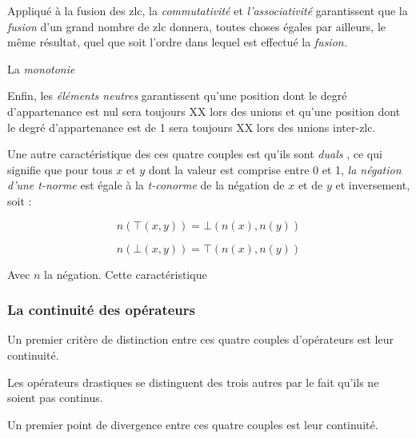 Appliqué à la fusion des \ac{zlc}, la \emph{commutativité} et
\emph{l'associativité} garantissent que la \emph{fusion} d'un grand
nombre de \ac{zlc} donnera, toutes choses égales par ailleurs, le même
résultat, quel que soit l'ordre dans lequel est effectué la
\emph{fusion.}

La \emph{monotonie}

Enfin, les \emph{éléments neutres} garantissent qu'une position dont
le degré d'appartenance est nul sera toujours XX lors des unions et
qu'une position dont le degré d’appartenance est de 1 sera toujours XX
lors des unions inter-\ac{zlc}.


Une autre caractéristique des ces quatre couples est qu'ils sont
\emph{duals} \autocite{Bouchon-Meunier2007}, ce qui signifie que pour
tous \(x\) et \(y\) dont la valeur est comprise entre 0 et 1, \emph{la
  négation d'une \emph{t-norme}} est égale à la \emph{t-conorme} de la
négation de \(x\) et de \(y\) et inversement, soit :

\begin{equation}
  n\left(⊤(x,y)\right) = ⊥\left(n(x), n(y)\right)
\end{equation}

\begin{equation}
  n\left(⊥(x,y)\right) = ⊤\left(n(x), n(y)\right)
\end{equation}

Avec \(n\) la négation. Cette caractéristique




\subsubsection{La continuité des opérateurs}

Un premier critère de distinction entre ces quatre couples
d'opérateurs est leur continuité.

Les opérateurs drastiques se distinguent des trois autres par le fait
qu'ils ne soient pas continus.


Un premier point de divergence entre ces quatre couples est leur
continuité.



